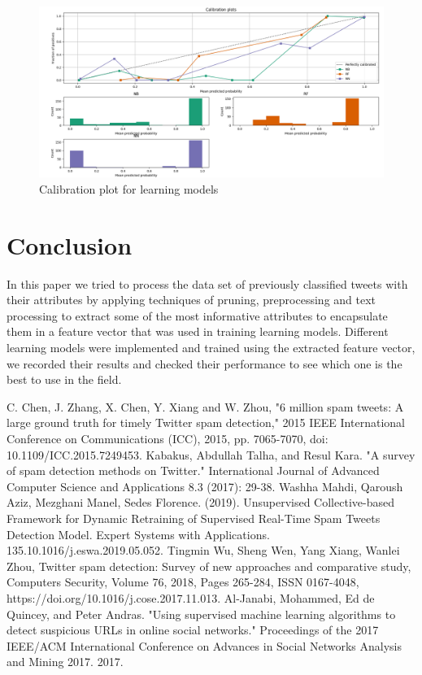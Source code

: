 \documentclass[conference]{IEEEtran}
\begin{document}
\begin{figure}
    \centering
    \includegraphics[scale=0.2]{calibration-plot.png}
    \caption{Calibration plot for learning models}
    \label{fig:cab}
\end{figure}

\section{Conclusion}
In this paper we tried to process the data set of previously classified tweets with their attributes by applying techniques of pruning, preprocessing and text processing to extract some of the most informative attributes to encapsulate them in a feature vector that was used in training learning models. Different learning models were implemented and trained using the extracted feature vector, we recorded their results and checked their performance to see which one is the best to use in the field.

\begin{thebibliography}{00}

 C. Chen, J. Zhang, X. Chen, Y. Xiang and W. Zhou, "6 million spam tweets: A large ground truth for timely Twitter spam detection," 2015 IEEE International Conference on Communications (ICC), 2015, pp. 7065-7070, doi: 10.1109/ICC.2015.7249453.
Kabakus, Abdullah Talha, and Resul Kara. "A survey of spam detection methods on Twitter." International Journal of Advanced Computer Science and Applications 8.3 (2017): 29-38.
Washha Mahdi, Qaroush Aziz, Mezghani Manel, Sedes Florence. (2019). Unsupervised Collective-based Framework for Dynamic Retraining of Supervised Real-Time Spam Tweets Detection Model. Expert Systems with Applications. 135.10.1016/j.eswa.2019.05.052. 
Tingmin Wu, Sheng Wen, Yang Xiang, Wanlei Zhou, Twitter spam detection: Survey of new approaches and comparative study, Computers Security, Volume 76, 2018, Pages 265-284, ISSN 0167-4048, https://doi.org/10.1016/j.cose.2017.11.013.
Al-Janabi, Mohammed, Ed de Quincey, and Peter Andras. "Using supervised machine learning algorithms to detect suspicious URLs in online social networks." Proceedings of the 2017 IEEE/ACM International Conference on Advances in Social Networks Analysis and Mining 2017. 2017.
\end{thebibliography}
\vspace{12pt}
\end{document}
